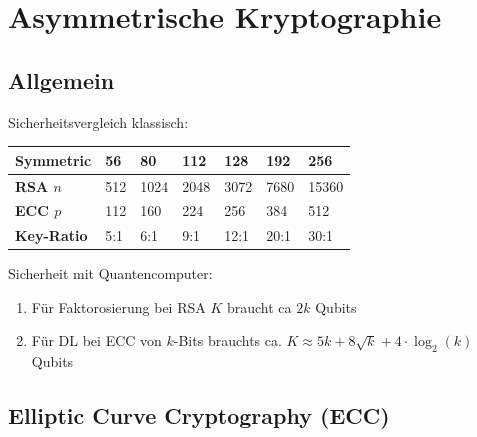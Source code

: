 \documentclass[12pt]{scrartcl}
\begin{document}
\newpage
\section{Asymmetrische Kryptographie}

\subsection{Allgemein}

Sicherheitsvergleich klassisch:
\renewcommand{\arraystretch}{1.5}
\begin{center}
    \begin{tabular}{ | m{11em} | P{4em} | P{4em} | P{4em} | P{4em} | P{4em} | P{4em} |}
        \hline
        \textbf{Symmetric}   & \textbf{56}    & \textbf{80}    & \textbf{112}   & \textbf{128}   & \textbf{192}   & \textbf{256}   \\
        \hline
        \textbf{RSA $n$  }   & 512   & 1024  & 2048  & 3072  & 7680  & 15360     \\
        \hline
        \textbf{ECC $p$  }   & 112   & 160   & 224   & 256   & 384   & 512     \\
        \hline
        \textbf{Key-Ratio}   & 5:1   & 6:1   & 9:1   & 12:1  & 20:1  & 30:1     \\
        \hline
    \end{tabular}
\end{center}


\vspace{0.5cm}
Sicherheit mit Quantencomputer:
\begin{enumerate}
    \item Für Faktorosierung bei RSA $K$ braucht ca $2k$ Qubits
    \item Für DL bei ECC von $k$-Bits brauchts ca. $K \approx 5k + 8 \sqrt{k} + 4 \cdot \log_2(k)$ Qubits
\end{enumerate}



\newpage
\subsection{Elliptic Curve Cryptography (ECC)}
\end{document}
